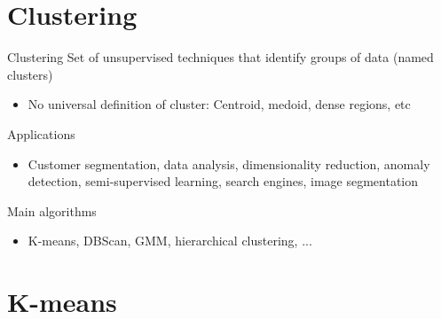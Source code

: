\documentclass[10pt,compress]{beamer} %
\begin{document}
\section{Clustering}

\begin{frame}{Clustering}
	Set of unsupervised techniques that identify groups of data (named \alert{clusters})
    \begin{itemize}
        \item No universal definition of cluster: Centroid, medoid, dense regions, etc
    \end{itemize}

    Applications
	\begin{itemize}
		\item Customer segmentation, data analysis, dimensionality reduction, anomaly detection, semi-supervised learning, search engines, image segmentation
	\end{itemize}

    Main algorithms
	\begin{itemize}
		\item K-means, DBScan, GMM, hierarchical clustering, ...
	\end{itemize}
\end{frame}

\section{K-means}
\end{document}
